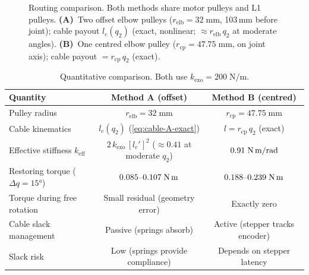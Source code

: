 \documentclass[11pt, a4paper]{article}
\begin{document}
\begin{figure}[h]
\caption{Routing comparison.  Both methods share motor pulleys and L1
pulleys.  \textbf{(A)}~Two offset elbow pulleys ($r_{\text{elb}} = 32\;\text{mm}$,
103\,mm before joint); cable payout $l_c(q_2)$ (exact, nonlinear;
$\approx r_{\text{elb}}\,q_2$ at moderate angles).
\textbf{(B)}~One centred elbow pulley ($r_{\text{cp}} = 47.75\;\text{mm}$,
on joint axis); cable payout $= r_{\text{cp}}\,q_2$ (exact).}
\label{fig:routing-comparison}
\end{figure}

\begin{table}[h]
\centering
\begin{tabular}{@{}lcc@{}}
\toprule
\textbf{Quantity}
    & \textbf{Method A (offset)}
    & \textbf{Method B (centred)} \\
\midrule
Pulley radius
    & $r_{\text{elb}} = 32\;\text{mm}$
    & $r_{\text{cp}} = 47.75\;\text{mm}$ \\[3pt]
Cable kinematics
    & $l_c(q_2)$ (\cref{eq:cable-A-exact})
    & $l = r_{\text{cp}}\,q_2$ (exact) \\[3pt]
Effective stiffness $k_{\text{eff}}$
    & $2\,k_{\text{exo}}\,[l_c']^2$ ($\approx 0.41$ at moderate $q_2$)
    & $0.91\;\text{N\,m/rad}$ \\[3pt]
Restoring torque ($\Delta q = 15°$)
    & $0.085$--$0.107\;\text{N\,m}$
    & $0.188$--$0.239\;\text{N\,m}$ \\[3pt]
Torque during free rotation
    & Small residual (geometry error)
    & Exactly zero \\[3pt]
Cable slack management
    & Passive (springs absorb)
    & Active (stepper tracks encoder) \\[3pt]
Slack risk
    & Low (springs provide compliance)
    & Depends on stepper latency \\
\bottomrule
\end{tabular}
\caption{Quantitative comparison.  Both use $k_{\text{exo}} = 200\;\text{N/m}$.}
\label{tab:force-comparison}
\end{table}
\end{document}
